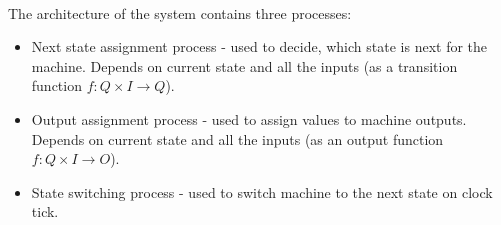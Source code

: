 \documentclass{article}
\begin{document}
	\ \\
	The architecture of the system contains three processes:
	\begin{itemize}[nosep]
		\item Next state assignment process - used to decide, which state is next for the machine. Depends on current state and all the inputs (as a transition function $f: Q \times I \rightarrow Q$).
		\item Output assignment process - used to assign values to machine outputs. Depends on current state and all the inputs (as an output function $f: Q \times I \rightarrow O$).
		\item State switching process - used to switch machine to the next state on clock tick.
	\end{itemize}

	
	
\end{document}
